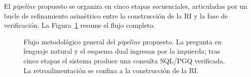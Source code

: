 El \emph{pipeline} propuesto se organiza en cinco etapas secuenciales, articuladas por un bucle de refinamiento asimétrico entre la construcción de la \ac{RI} y la fase de verificación. La Figura~\ref{fig:prop-pipeline} resume el flujo completo.

\begin{figure}[htb]
    \centering
    \caption{Flujo metodológico general del \emph{pipeline} propuesto. La pregunta en lenguaje natural y el esquema dual ingresan por la izquierda; tras cinco etapas el sistema produce una consulta \ac{SQL}/\ac{PGQ} verificada. La retroalimentación se confina a la construcción de la \ac{RI}.}
    \label{fig:prop-pipeline}
\end{figure}

